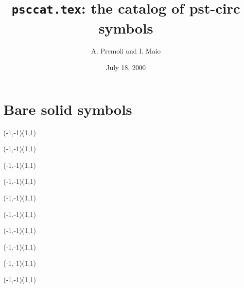 \documentclass[12pt,a4paper]{article}
\title{\vspace*{-2cm}
\texttt{psccat.tex}: the catalog of pst-circ symbols}
\author{A. Premoli and I. Maio}
\date{July 18, 2000}
\begin{document}
\maketitle

\section{Bare solid symbols}

\psen

\showgrid
\begin{PSideBySideExample}(-1,-1)(1,1)
  \pstt
\end{PSideBySideExample}
\medskip

\showgrid
\begin{PSideBySideExample}(-1,-1)(1,1)
  \psatt
\end{PSideBySideExample}
\medskip

\showgrid
\begin{PSideBySideExample}(-1,-1)(1,1)
  \psb
\end{PSideBySideExample}
\medskip

\showgrid
\begin{PSideBySideExample}(-1,-1)(1,1)
  \psv
\end{PSideBySideExample}
\medskip

\showgrid
\begin{PSideBySideExample}(-1,-1)(1,1)
  \psj
\end{PSideBySideExample}

\showgrid
\begin{PSideBySideExample}(-1,-1)(1,1)
  \pscv
\end{PSideBySideExample}
\medskip

\showgrid
\begin{PSideBySideExample}(-1,-1)(1,1)
  \pscj
\end{PSideBySideExample}

\showgrid
\begin{PSideBySideExample}(-1,-1)(1,1)
  \psr
\end{PSideBySideExample}

\showgrid
\begin{PSideBySideExample}(-1,-1)(1,1)
  \psnr
\end{PSideBySideExample}

\showgrid
\begin{PSideBySideExample}(-1,-1)(1,1)
  \psid
\end{PSideBySideExample}
\end{document}
